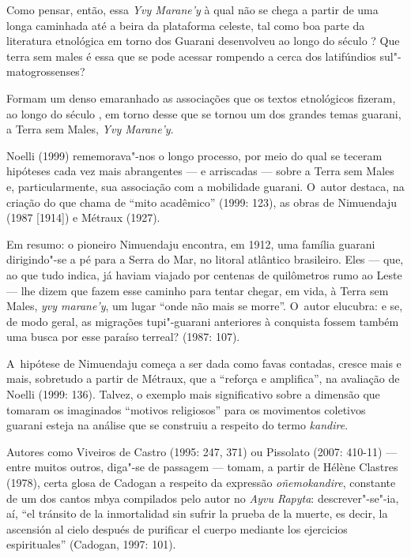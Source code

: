 Como pensar, então, essa \emph{Yvy Marane’y} à qual não se chega a partir de
uma longa caminhada até a beira da plataforma celeste, tal como boa
parte da literatura etnológica em torno dos Guarani desenvolveu ao
longo do século ? Que terra sem males é essa que se pode acessar
rompendo a cerca dos latifúndios sul"-matogrossenses?

Formam um denso emaranhado as associações que os textos etnológicos
fizeram, ao longo do século , em torno desse que se tornou um dos
grandes temas guarani, a Terra sem Males, \emph{Yvy Marane’y}.

Noelli (1999) rememorava"-nos o longo processo, por meio do qual se
teceram hipóteses cada vez mais abrangentes --- e arriscadas --- sobre a
Terra sem Males e, particularmente, sua associação com a mobilidade
guarani. O~autor destaca, na criação do que chama de ``mito acadêmico''
(1999: 123), as obras de Nimuendaju (1987 [1914]) e Métraux (1927).

Em resumo: o pioneiro Nimuendaju encontra, em 1912, uma família guarani
dirigindo"-se a pé para a Serra do Mar, no litoral atlântico brasileiro.
Eles --- que, ao que tudo indica, já haviam viajado por centenas de
quilômetros rumo ao Leste --- lhe dizem que fazem esse caminho para
tentar chegar, em vida, à Terra sem Males, \emph{yvy marane’y}, um lugar ``onde
não mais se morre''. O~autor elucubra: e se, de modo geral, as migrações
tupi"-guarani anteriores à conquista fossem também uma busca por esse
paraíso terreal? (1987: 107).

A~hipótese de Nimuendaju começa a ser dada como favas contadas, cresce
mais e mais, sobretudo a partir de Métraux, que a ``reforça e
amplifica'', na avaliação de Noelli (1999: 136). Talvez, o exemplo mais
significativo sobre a dimensão que tomaram os imaginados ``motivos
religiosos'' para os movimentos coletivos guarani esteja na análise que
se construiu a respeito do termo \emph{kandire}.

Autores como Viveiros de Castro (1995: 247, 371) ou Pissolato (2007:
410-11) --- entre muitos outros, diga"-se de passagem --- tomam, a partir de
Hélène Clastres (1978), certa glosa de Cadogan a respeito da expressão
\emph{oñemokandire}, constante de um dos cantos mbya compilados pelo autor no
\emph{Ayvu Rapyta}: descrever"-se"-ia, aí, ``el tránsito de la inmortalidad sin
sufrir la prueba de la muerte, es decir, la ascensión al cielo después
de purificar el cuerpo mediante los ejercicios espirituales'' (Cadogan,
1997: 101). 

